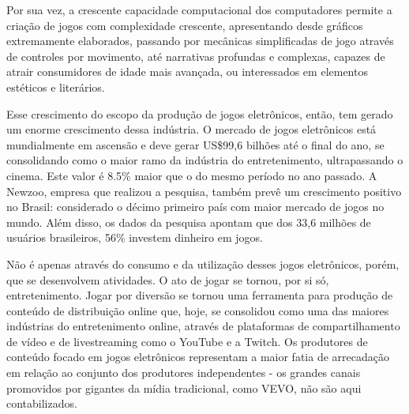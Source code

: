\documentclass[a4paper, 12pt]{paper}
\begin{document}
Por sua vez, a crescente capacidade computacional dos computadores permite a criação de jogos com complexidade crescente, apresentando desde gráficos extremamente elaborados, passando por mecânicas simplificadas de jogo através de controles por movimento, até narrativas profundas e complexas, capazes de atrair consumidores de idade mais avançada, ou interessados em elementos estéticos e literários.

Esse crescimento do escopo da produção de jogos eletrônicos, então, tem gerado um enorme crescimento dessa indústria. O mercado de jogos eletrônicos está mundialmente em ascensão e deve gerar US\$99,6 bilhões até o final do ano, se consolidando como o maior ramo da indústria do entretenimento, ultrapassando o cinema. Este valor é 8.5\% maior que o do mesmo período no ano passado. A Newzoo, empresa que realizou a pesquisa, também prevê um crescimento positivo no Brasil: considerado o décimo primeiro país com maior mercado de jogos no mundo. Além disso, os dados da pesquisa apontam que dos 33,6 milhões de usuários brasileiros, 56\% investem dinheiro em jogos.

Não é apenas através do consumo e da utilização desses jogos eletrônicos, porém, que se desenvolvem atividades. O ato de jogar se tornou, por si só, entretenimento. Jogar por diversão se tornou uma ferramenta para produção de conteúdo de distribuição online que, hoje, se consolidou como uma das maiores indústrias do entretenimento online, através de plataformas de compartilhamento de vídeo e de livestreaming como o YouTube e a Twitch. Os produtores de conteúdo focado em jogos eletrônicos representam a maior fatia de arrecadação em relação ao conjunto dos produtores independentes - os grandes canais promovidos por gigantes da mídia tradicional, como VEVO, não são aqui contabilizados.
\end{document}
